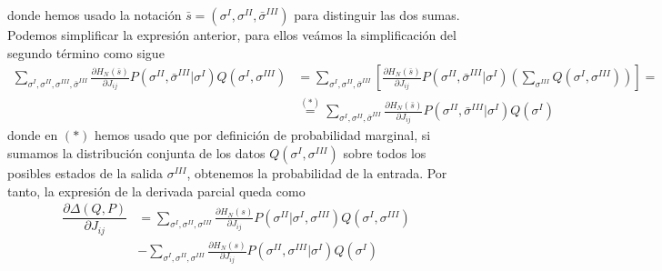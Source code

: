 donde hemos usado la notación $\bar{s} = (\sigma^I, \sigma^{II}, \bar{\sigma}^{III})$ para distinguir las dos sumas. Podemos simplificar la expresión anterior, para ellos veámos la simplificación del segundo término como sigue 
\begin{align*}
    \sum_{\sigma^I, \sigma^{II}, \sigma^{III}, \bar{\sigma}^{III}} \frac{\partial H_N(\bar{s})}{\partial J_{ij}} P(\sigma^{II}, \bar{\sigma}^{III} | \sigma^I) Q(\sigma^I, \sigma^{III})&= \sum_{\sigma^I, \sigma^{II}, \bar{\sigma}^{III}} \left[ \frac{\partial H_N(\bar{s})}{\partial J_{ij}} P(\sigma^{II}, \bar{\sigma}^{III} | \sigma^I) \left( \sum_{\sigma^{III}} Q(\sigma^I, \sigma^{III}) \right) \right]= \\
    &\overset{(*)}{=} \sum_{\sigma^I, \sigma^{II}, \bar{\sigma}^{III}} \frac{\partial H_N(\bar{s})}{\partial J_{ij}} P(\sigma^{II}, \bar{\sigma}^{III} | \sigma^I) Q(\sigma^I)
\end{align*}
donde en $(*)$ hemos usado que por definición de probabilidad marginal, si sumamos la distribución conjunta de los datos $Q(\sigma^I, \sigma^{III})$ sobre todos los posibles estados de la salida $\sigma^{III}$, obtenemos la probabilidad de la entrada. Por tanto, la expresión de la derivada parcial queda como
\begin{align*}
    \dfrac{\partial \Delta(Q, P)}{\partial J_{ij}} &= \sum_{\sigma^I, \sigma^{II}, \sigma^{III}} \frac{\partial H_N(s)}{\partial J_{ij}} P(\sigma^{II} | \sigma^I, \sigma^{III}) Q(\sigma^I, \sigma^{III}) \\
    &- \sum_{\sigma^I, \sigma^{II}, \sigma^{III}} \frac{\partial H_N(s)}{\partial J_{ij}} P(\sigma^{II}, \sigma^{III} | \sigma^I) Q(\sigma^I)
\end{align*}


